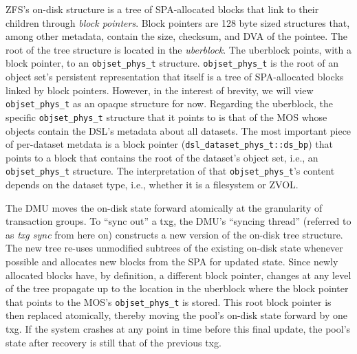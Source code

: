 \documentclass[12pt,a4paper,twoside]{book}
\begin{document}
ZFS's on-disk structure is a tree of SPA-allocated blocks that link to their children through \textit{block pointers}.
Block pointers are 128 byte sized structures that, among other metadata, contain the size, checksum, and DVA of the pointee.
The root of the tree structure is located in the \textit{uberblock}.
The uberblock points, with a block pointer, to an \lstinline{objset_phys_t} structure.
\lstinline{objset_phys_t} is the root of an object set's persistent representation that itself is a tree of SPA-allocated blocks linked by block pointers.
However, in the interest of brevity, we will view \lstinline{objset_phys_t} as an opaque structure for now.
Regarding the uberblock, the specific \lstinline{objset_phys_t} structure that it points to is that of the MOS whose objects contain the DSL's metadata about all datasets.
The most important piece of per-dataset metdata is a block pointer (\lstinline{dsl_dataset_phys_t::ds_bp}) that points to a block that contains the root of the dataset's object set, i.e., an \lstinline{objset_phys_t} structure.
The interpretation of that \lstinline{objset_phys_t}'s content depends on the dataset type, i.e., whether it is a filesystem or ZVOL.

The DMU moves the on-disk state forward atomically at the granularity of transaction groups.
To ``sync out'' a txg, the DMU's ``syncing thread'' (referred to as \textit{txg sync} from here on) constructs a new version of the on-disk tree structure.
The new tree re-uses unmodified subtrees of the existing on-disk state whenever possible and allocates new blocks from the SPA for updated state.
Since newly allocated blocks have, by definition, a different block pointer, changes at any level of the tree propagate up to the location in the uberblock where the block pointer that points to the MOS's \lstinline{objset_phys_t} is stored.
This root block pointer is then replaced atomically, thereby moving the pool's on-disk state forward by one txg.
If the system crashes at any point in time before this final update, the pool's state after recovery is still that of the previous txg.
\end{document}
